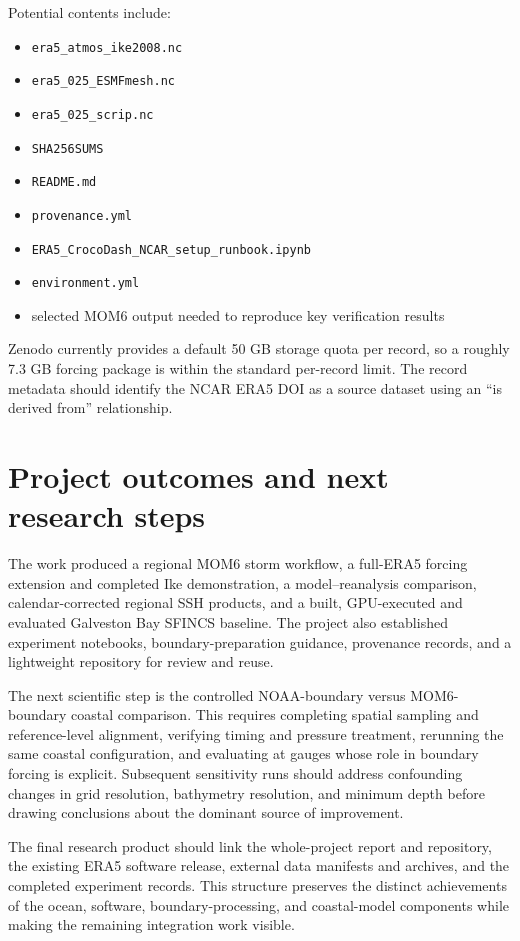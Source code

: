 \documentclass[11pt]{article}
\newcommand{\code}[1]{\texttt{#1}}
\begin{document}
Potential contents include:
\begin{itemize}
  \item \code{era5\_atmos\_ike2008.nc}
  \item \code{era5\_025\_ESMFmesh.nc}
  \item \code{era5\_025\_scrip.nc}
  \item \code{SHA256SUMS}
  \item \code{README.md}
  \item \code{provenance.yml}
  \item \code{ERA5\_CrocoDash\_NCAR\_setup\_runbook.ipynb}
  \item \code{environment.yml}
  \item selected MOM6 output needed to reproduce key verification results
\end{itemize}

Zenodo currently provides a default 50 GB storage quota per record, so a roughly 7.3 GB forcing package is within the standard per-record limit. The record metadata should identify the NCAR ERA5 DOI as a source dataset using an ``is derived from'' relationship.

\section{Project outcomes and next research steps}

The work produced a regional MOM6 storm workflow, a full-ERA5 forcing extension and completed Ike demonstration, a model--reanalysis comparison, calendar-corrected regional SSH products, and a built, GPU-executed and evaluated Galveston Bay SFINCS baseline. The project also established experiment notebooks, boundary-preparation guidance, provenance records, and a lightweight repository for review and reuse.

The next scientific step is the controlled NOAA-boundary versus MOM6-boundary coastal comparison. This requires completing spatial sampling and reference-level alignment, verifying timing and pressure treatment, rerunning the same coastal configuration, and evaluating at gauges whose role in boundary forcing is explicit. Subsequent sensitivity runs should address confounding changes in grid resolution, bathymetry resolution, and minimum depth before drawing conclusions about the dominant source of improvement.

The final research product should link the whole-project report and repository, the existing ERA5 software release, external data manifests and archives, and the completed experiment records. This structure preserves the distinct achievements of the ocean, software, boundary-processing, and coastal-model components while making the remaining integration work visible.
\end{document}
